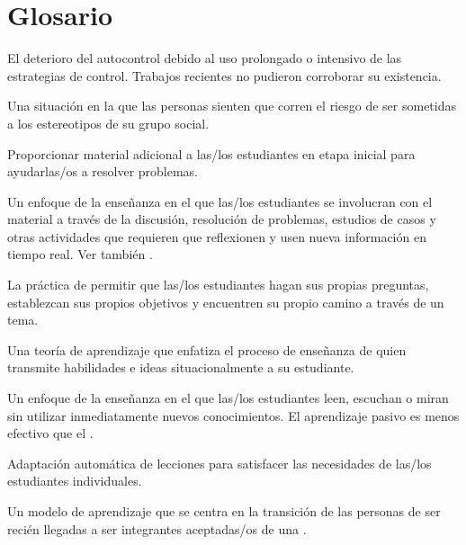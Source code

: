 \chapter{Glosario}\label{s:gloss}

\begin{description}

 El deterioro del autocontrol debido al uso prolongado o intensivo de las estrategias de control.
Trabajos recientes no pudieron corroborar su existencia.

 Una situación en la que las personas sienten que corren el riesgo de ser sometidas a los estereotipos de su grupo social.

 Proporcionar material adicional a las/los estudiantes
en etapa inicial para ayudarlas/os a resolver problemas.

 Un enfoque de la enseñanza en el que
las/los estudiantes se involucran con el material a través de la discusión, resolución de problemas, estudios de casos
y otras actividades que requieren que reflexionen y usen nueva información en
tiempo real. Ver también .

 La práctica de permitir que 
las/los estudiantes hagan sus propias preguntas, establezcan sus propios objetivos y encuentren su propio camino a través de un tema.

 Una teoría de
aprendizaje que enfatiza el proceso de enseñanza de quien transmite habilidades e ideas
situacionalmente a su estudiante.

 Un enfoque de la enseñanza en el que las/los 
estudiantes leen, escuchan o miran sin utilizar inmediatamente nuevos conocimientos. 
El aprendizaje pasivo es menos efectivo que el .

 Adaptación automática de lecciones para 
satisfacer las necesidades de las/los estudiantes individuales.

 Un modelo de aprendizaje que se centra en la transición de 
las personas de ser recién llegadas a ser integrantes aceptadas/os de una
.


\end{description}
